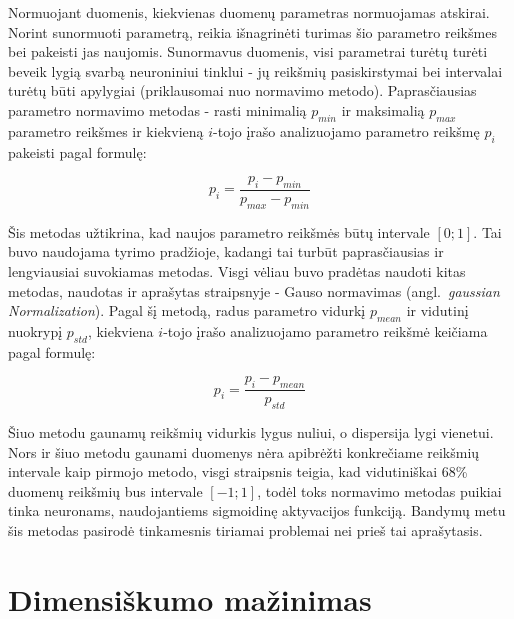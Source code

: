 \documentclass{VUMIFPSbakalaurinis}
\begin{document}
Normuojant duomenis, kiekvienas duomenų parametras normuojamas atskirai.
Norint sunormuoti parametrą, reikia išnagrinėti turimas šio parametro reikšmes bei pakeisti jas naujomis.
Sunormavus duomenis, visi parametrai turėtų turėti beveik lygią svarbą neuroniniui tinklui - jų reikšmių pasiskirstymai bei intervalai turėtų būti apylygiai (priklausomai nuo normavimo metodo).
Paprasčiausias parametro normavimo metodas - rasti minimalią $p_{min}$ ir maksimalią $p_{max}$ parametro reikšmes ir kiekvieną $i$-tojo įrašo analizuojamo parametro reikšmę $p_i$ pakeisti pagal formulę:

\begin{equation}
p_i = \frac{p_i - p_{min}}{p_{max} - p_{min}}
\end{equation}

Šis metodas užtikrina, kad naujos parametro reikšmės būtų intervale $[0; 1]$.
Tai buvo naudojama tyrimo pradžioje, kadangi tai turbūt paprasčiausias ir lengviausiai suvokiamas metodas.
Visgi vėliau buvo pradėtas naudoti kitas metodas, naudotas ir aprašytas \cite[817~psl.]{gaussian} straipsnyje - Gauso normavimas (angl.~\textit{gaussian Normalization}).
Pagal šį metodą, radus parametro vidurkį $p_{mean}$ ir vidutinį nuokrypį $p_{std}$, kiekviena $i$-tojo įrašo analizuojamo parametro reikšmė keičiama pagal formulę:

\begin{equation}
p_i = \frac{p_i - p_{mean}}{p_{std}}
\end{equation}

Šiuo metodu gaunamų reikšmių vidurkis lygus nuliui, o dispersija lygi vienetui.
Nors ir šiuo metodu gaunami duomenys nėra apibrėžti konkrečiame reikšmių intervale kaip pirmojo metodo, visgi \cite[817~psl.]{gaussian} straipsnis teigia, kad vidutiniškai 68\% duomenų reikšmių bus intervale $[-1; 1]$, todėl toks normavimo metodas puikiai tinka neuronams, naudojantiems sigmoidinę aktyvacijos funkciją.
Bandymų metu šis metodas pasirodė tinkamesnis tiriamai problemai nei prieš tai aprašytasis.



\section{Dimensiškumo mažinimas}
\end{document}
